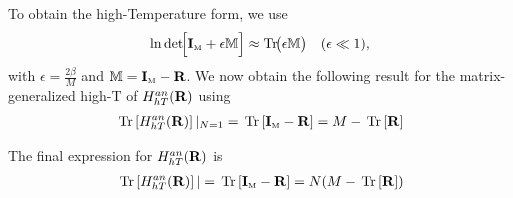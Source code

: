 To obtain the high-Temperature form, we use
\begin{align}
\ln\det\!\Bigl[\mathbf{I}_{\text{\tiny M}} + \epsilon\mathbb{M}\Bigr]
\approx \mathrm{Tr}\!\bigl(\epsilon\mathbb{M}\bigr)
\quad(\epsilon\ll 1),
\end{align}
with $\epsilon=\tfrac{2\beta}{M}$ and $\mathbb{M}=\mathbf{I}_{\text{\tiny M}}-\mathbf{R}$.   
We now obtain the following result for the matrix-generalized high-T of $H^{an}_{hT}(\mathbf{R})$ using
\begin{align}
\label{eqn:GANHTmatRN1}
\Trace{\GANMATHT}\vert_{N=1} = \Trace{\IM-\OVERLAP} = M-\Trace{\OVERLAP}
\end{align}

The final expression for $H^{an}_{hT}(\mathbf{R})$ is
\begin{align}
\label{eqn:GANHTmatR}
\Trace{\GANMATHT}\vert = \Trace{\IM-\OVERLAP} = N(M-\Trace{\OVERLAP})
\end{align}




